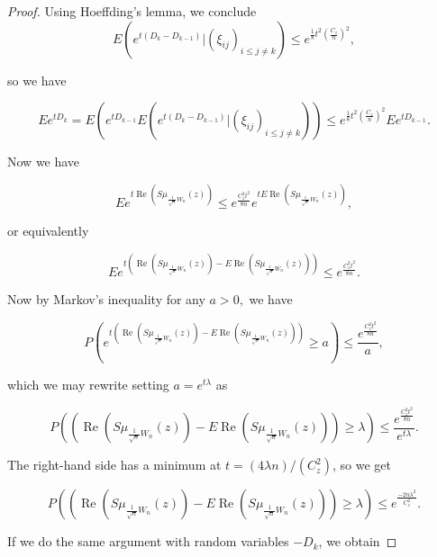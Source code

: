 \documentclass[12pt,a4paper,leqno]{report}
\renewcommand{\Re}{\operatorname{Re}}
\theoremstyle{plain}
\theoremstyle{definition}
\theoremstyle{remark}
\begin{document}
\begin{proof}
Using Hoeffding's lemma, we conclude
\begin{equation*}
E(e^{t(D_k-D_{k-1})}|(\xi_{ij})_{i\leq j \neq k}) \leq
e^{\frac{1}{8}t^2 \left(\frac{C_z}{n}\right)^2},
\end{equation*}

so we have

\begin{equation*}
Ee^{tD_k} = E(e^{tD_{k-1}}E(e^{t(D_k-D_{k-1})}|(\xi_{ij})_{i\leq j \neq k})) \leq e^{\frac{1}{8}t^2 \left(\frac{C_z}{n}\right)^2}Ee^{tD_{k-1}}. 
\end{equation*}

Now we have 

\begin{equation*}
Ee^{t\Re(S\mu_{\frac{1}{\sqrt{n}}W_n}(z))} \leq e^{\frac{C_z^2t^2}{8n}} e^{tE\Re(S\mu_{\frac{1}{\sqrt{n}}W_n}(z))},
\end{equation*}

or equivalently

\begin{equation*}
Ee^{t(\Re(S\mu_{\frac{1}{\sqrt{n}}W_n}(z))-E\Re(S\mu_{\frac{1}{\sqrt{n}}W_n}(z)))} \leq e^{\frac{C_z^2t^2}{8n}}.
\end{equation*}

Now by Markov's inequality for any $a > 0,$ we have

\begin{equation*}
P\left(e^{t(\Re(S\mu_{\frac{1}{\sqrt{n}}W_n}(z))-E\Re(S\mu_{\frac{1}{\sqrt{n}}W_n}(z)))} \geq  a \right) \leq \frac{e^{\frac{C_z^2t^2}{8n}}}{a},
\end{equation*}

which we may rewrite setting $a = e^{t\lambda}$ as

\begin{equation*}
P\left((\Re(S\mu_{\frac{1}{\sqrt{n}}W_n}(z))-E\Re(S\mu_{\frac{1}{\sqrt{n}}W_n}(z))) \geq  \lambda \right) \leq \frac{e^{\frac{C_z^2t^2}{8n}}}{e^{t\lambda}}.
\end{equation*}

The right-hand side has a minimum at $t=(4\lambda n)/(C_z^2)$, so we get

\begin{equation*}
P\left((\Re(S\mu_{\frac{1}{\sqrt{n}}W_n}(z))-E\Re(S\mu_{\frac{1}{\sqrt{n}}W_n}(z))) \geq  \lambda \right) \leq
e^{\frac{-2n\lambda^2}{C_z^2}}.
\end{equation*}

If we do the same argument with random variables $-D_k$, we obtain


\end{proof}
\end{document}
